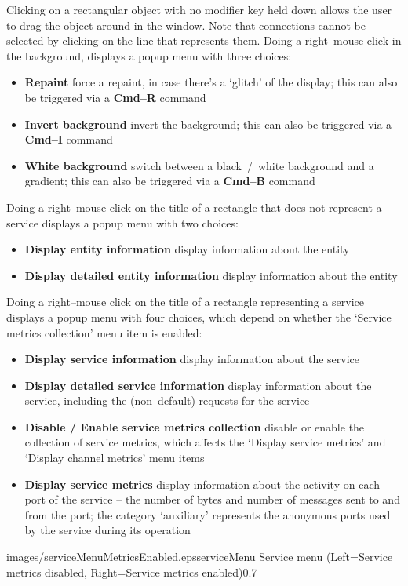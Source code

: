 Clicking on a rectangular object with no modifier key held down allows the user to drag
the object around in the window.
Note that connections cannot be selected by clicking on the line that represents them.
\clearpage
Doing a right--mouse click in the background, displays a popup menu with three choices:
\begin{itemize}
\item \textbf{Repaint} force a repaint, in case there's a `glitch' of the display; this
can also be triggered via a \textbf{Cmd--R} command
\item \textbf{Invert background} invert the background; this can also be triggered via a
\textbf{Cmd--I} command
\item \textbf{White background} switch between a black~/~white background and a gradient;
this can also be triggered via a \textbf{Cmd--B} command
\end{itemize}
Doing a right--mouse click on the title of a rectangle that does not represent a service
displays a popup menu with two choices:
\begin{itemize}
\item \textbf{Display entity information} display information about the entity
\item \textbf{Display detailed entity information} display information about the entity
\end{itemize}
\clearpage
Doing a right--mouse click on the title of a rectangle representing a service displays a
popup menu with four choices, which depend on whether the `Service metrics collection'
menu item is enabled:
\begin{itemize}
\item \textbf{Display service information} display information about the service
\item \textbf{Display detailed service information} display information about the service,
including the (non--default) requests for the service
\item \textbf{Disable / Enable service metrics collection} disable or enable the
collection of service metrics, which affects the `Display service metrics' and `Display
channel metrics' menu items
\item \textbf{Display service metrics} display information about the activity on each port
of the service -- the number of bytes and number of messages sent to and from the port;
the category `auxiliary' represents the anonymous ports used by the service during its
operation
\end{itemize}
%
{images/serviceMenuMetricsEnabled.eps}{serviceMenu}%
{Service menu (Left=Service metrics disabled, Right=Service metrics enabled)}{0.7}

